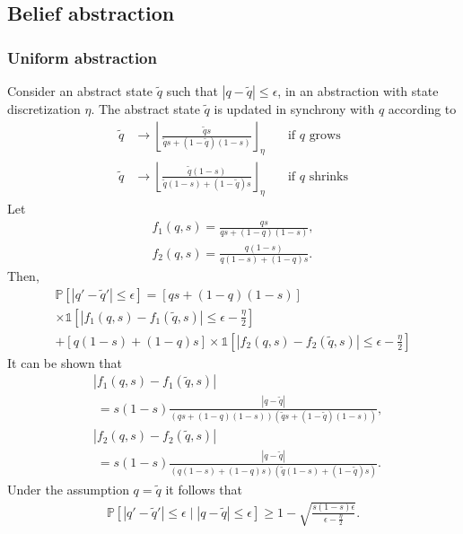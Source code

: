 \documentclass[conference]{IEEEtran}
\begin{document}
\subsection{Belief abstraction}

\subsubsection{Uniform abstraction}

Consider an abstract state $\tilde q$ such that $|q - \tilde q| \leq \epsilon$, in an abstraction with state discretization $\eta$. The abstract state $\tilde q$ is updated in synchrony with $q$ according to
\begin{equation}
\begin{aligned}
  \tilde q &  \longrightarrow \left \lfloor \frac{\tilde qs}{\tilde qs + (1-\tilde q)(1-s)} \right \rfloor_\eta \quad &  \text{if $q$ grows} \\
  \tilde q & \longrightarrow \left \lfloor \frac{\tilde q(1-s)}{\tilde q(1-s) + (1-\tilde q)s} \right \rfloor_\eta \quad &  \text{if $q$ shrinks}
\end{aligned}
\end{equation}
Let 
\begin{equation}
\begin{aligned}
  f_1(q,s) = \frac{qs}{qs + (1-q)(1-s)}, \\
  f_2(q,s) = \frac{q(1-s)}{q(1-s) + (1-q)s}.
\end{aligned}
\end{equation}
Then, 
\begin{equation*}
\begin{aligned}
  \mathbb{P} \left[ |q' - \tilde q'| \leq \epsilon \right] = \left[qs + (1-q)(1-s)\right] \\
  \times \mathds{1} \left[ |f_1(q,s) - f_1(\tilde q,s)| \leq \epsilon - \frac{\eta}{2} \right] \\ + \left[q(1-s) + (1-q)s \right] \times \mathds{1} \left[ |f_2(q,s) - f_2(\tilde q,s)| \leq \epsilon - \frac{\eta}{2} \right]
\end{aligned}
\end{equation*}
It can be shown that
\begin{equation*}
\begin{aligned}
  & |f_1(q,s) - f_1(\tilde q,s)| \\ 
  & \; = s(1-s) \frac{|q - \tilde q|}{(qs + (1-q)(1-s))(\tilde qs + (1-\tilde q)(1-s))}, \\
  & |f_2(q,s) - f_2(\tilde q,s)| \\ 
  & \; = s(1-s) \frac{|q - \tilde q|}{(q(1-s) + (1-q)s)(\tilde q(1-s) + (1-\tilde q)s)}.
\end{aligned}
\end{equation*}
Under the assumption $q = \tilde q$ it follows that
\begin{equation}
\begin{aligned}
  \mathbb{P} \left[ |q' - \tilde q'| \leq \epsilon \mid |q-\tilde q| \leq \epsilon \right] \geq 1 - \sqrt{\frac{s(1-s) \epsilon}{\epsilon - \frac{\eta}{2}}}.
\end{aligned}
\end{equation}
\end{document}
